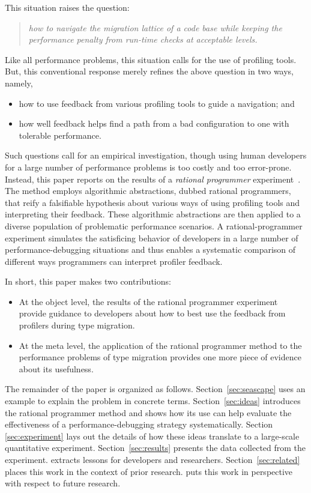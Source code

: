 This situation raises the question:
\begin{quote} \em
 how to navigate the migration lattice of a code base while keeping
 the performance penalty from run-time checks at acceptable levels.
\end{quote}  
Like all performance problems, this situation calls for the use of profiling
tools. But, this conventional response merely refines the above question in two
ways, namely,
\begin{itemize} \em

\item how to use feedback from various profiling tools to guide a navigation; and

\item how well feedback helps find a path from a bad configuration to one with
 tolerable performance.

\end{itemize}   

Such questions call for an empirical investigation, though using human
developers for a large number of performance problems is too costly and too
error-prone. Instead, this paper reports on the results of a \emph{rational
programmer} experiment~\cite{lksfd-popl-2020,lgfd-icfp-2021}. The method employs algorithmic
abstractions, dubbed rational programmers, that reify a falsifiable hypothesis
about various ways of using profiling tools and interpreting their feedback.
These algorithmic abstractions are then applied to a diverse population of
problematic performance scenarios. A rational-programmer experiment simulates the
satisficing behavior of developers in a large number of performance-debugging
situations and thus enables a systematic comparison of different ways
programmers can interpret profiler feedback.

In short, this paper makes two contributions:
\begin{itemize}

\item At the object level, the results of the rational programmer experiment
 provide guidance to developers about how to best use the feedback from
 profilers during type migration.

\item At the meta level, the application of the rational programmer method to
 the performance problems of type migration provides one more piece of evidence
 about its usefulness. 
    
\end{itemize}    
The remainder of the paper is organized as follows.  Section~\ref{sec:seascape}
uses an example to explain the problem in concrete terms. Section~\ref{sec:ideas}
introduces the rational programmer method and shows how its use can help evaluate the
effectiveness of a performance-debugging strategy systematically. Section
\ref{sec:experiment} lays out the details of how these ideas translate to a
large-scale quantitative experiment.  Section~\ref{sec:results} presents the data
collected from the experiment.
 extracts lessons
for developers and researchers.  Section~\ref{sec:related} places this work in
the context of prior research.
 puts this work in
perspective with respect to future research.
